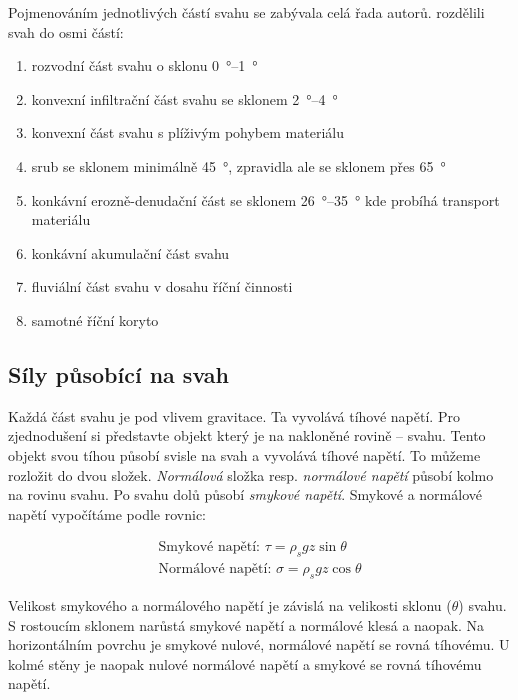 Pojmenováním jednotlivých částí svahu se zabývala celá řada autorů. \textcite{dalrympleHypotheticalNineUnit1968} rozdělili svah do osmi částí:
\begin{enumerate}
	\item rozvodní část svahu o sklonu \SIrange{0}{1}{\degree}
	\item konvexní infiltrační část svahu se sklonem \SIrange{2}{4}{\degree}
	\item konvexní část svahu s plíživým pohybem materiálu 
	\item srub se sklonem minimálně \SI{45}{\degree}, zpravidla ale se sklonem přes \SI{65}{\degree}
	\item konkávní erozně-denudační část se sklonem \SIrange{26}{35}{\degree} kde probíhá transport materiálu
	\item konkávní akumulační část svahu
	\item fluviální část svahu v dosahu říční činnosti
	\item samotné říční koryto
\end{enumerate}

\subsection{Síly působící na svah}
Každá část svahu je pod vlivem gravitace. Ta vyvolává tíhové napětí. Pro zjednodušení si představte objekt který je na nakloněné rovině -- svahu. Tento objekt svou tíhou působí svisle na svah a vyvolává tíhové napětí. To můžeme rozložit do dvou složek. \emph{Normálová} složka resp. \emph{normálové napětí} působí kolmo na rovinu svahu. Po svahu dolů působí \emph{smykové napětí}. Smykové a normálové napětí vypočítáme podle rovnic:

\begin{align}
\text{Smykové napětí: }	\tau = \rho_{s}gz\sin{\theta}\\
\text{Normálové napětí: }	\sigma = \rho_{s}gz\cos{\theta}
\end{align}

Velikost smykového a normálového napětí je závislá na velikosti sklonu ($\theta$) svahu. S rostoucím sklonem narůstá smykové napětí a normálové klesá a naopak. Na horizontálním povrchu je smykové nulové, normálové napětí se rovná tíhovému. U kolmé stěny je naopak nulové normálové napětí a smykové se rovná tíhovému napětí.

